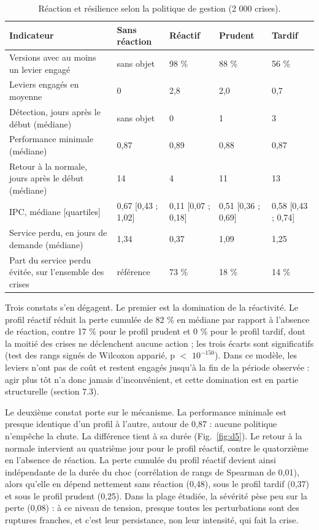\begin{table}[htbp]
\caption{Réaction et résilience selon la politique de gestion (2 000 crises).}
\label{tab:d12}
\footnotesize
\begin{tabularx}{\textwidth}{@{}LP{2.3cm}P{2.3cm}P{2.3cm}P{2.3cm}@{}}
\toprule
\textbf{Indicateur} & \textbf{Sans réaction} & \textbf{Réactif} & \textbf{Prudent} & \textbf{Tardif} \\
\midrule
Versions avec au moins un levier engagé & sans objet & 98 \% & 88 \% & 56 \% \\
Leviers engagés en moyenne & 0 & 2,8 & 2,0 & 0,7 \\
Détection, jours après le début (médiane) & sans objet & 0 & 1 & 3 \\
Performance minimale (médiane) & 0,87 & 0,89 & 0,88 & 0,87 \\
Retour à la normale, jours après le début (médiane) & 14 & 4 & 11 & 13 \\
IPC, médiane [quartiles] & 0,67 [0,43 ; 1,02] & 0,11 [0,07 ; 0,18] & 0,51 [0,36 ; 0,69] & 0,58 [0,43 ; 0,74] \\
Service perdu, en jours de demande (médiane) & 1,34 & 0,37 & 1,09 & 1,25 \\
Part du service perdu évitée, sur l'ensemble des crises & référence & 73 \% & 18 \% & 14 \% \\
\bottomrule
\end{tabularx}
\end{table}

Trois constats s'en dégagent. Le premier est la domination de la réactivité. Le profil réactif réduit la perte cumulée de 82 \% en médiane par rapport à l'absence de réaction, contre 17 \% pour le profil prudent et 0 \% pour le profil tardif, dont la moitié des crises ne déclenchent aucune action ; les trois écarts sont significatifs (test des rangs signés de Wilcoxon apparié, p $<$ $10^{-150}$). Dans ce modèle, les leviers n'ont pas de coût et restent engagés jusqu'à la fin de la période observée : agir plus tôt n'a donc jamais d'inconvénient, et cette domination est en partie structurelle (section 7.3).

Le deuxième constat porte sur le mécanisme. La performance minimale est presque identique d'un profil à l'autre, autour de 0,87 : aucune politique n'empêche la chute. La différence tient à sa durée (Fig.~\ref{fig:d5}). Le retour à la normale intervient au quatrième jour pour le profil réactif, contre le quatorzième en l'absence de réaction. La perte cumulée du profil réactif devient ainsi indépendante de la durée du choc (corrélation de rangs de Spearman de 0,01), alors qu'elle en dépend nettement sans réaction (0,48), sous le profil tardif (0,37) et sous le profil prudent (0,25). Dans la plage étudiée, la sévérité pèse peu sur la perte (0,08) : à ce niveau de tension, presque toutes les perturbations sont des ruptures franches, et c'est leur persistance, non leur intensité, qui fait la crise.

